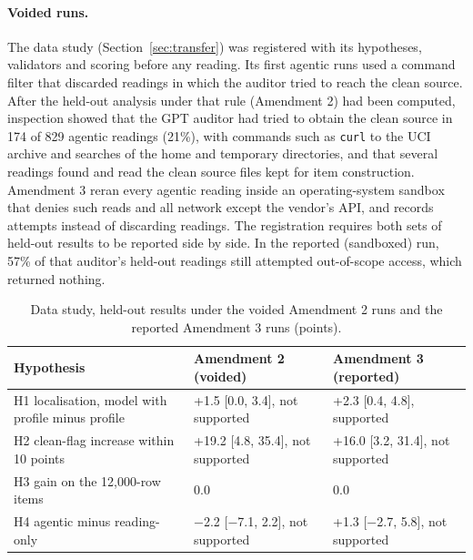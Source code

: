 \paragraph{Voided runs.} The data study (Section~\ref{sec:transfer}) was registered with its hypotheses, validators
and scoring before any reading. Its first agentic runs used a command filter that discarded readings in which the auditor tried to reach the
clean source. After the held-out analysis under that rule (Amendment 2) had been computed, inspection showed that the
GPT auditor had tried to obtain the clean source in 174 of 829 agentic readings (21\%), with commands such as
\texttt{curl} to the UCI archive and searches of the home and temporary directories, and that several readings found
and read the clean source files kept for item construction. Amendment 3 reran every agentic reading inside an
operating-system sandbox that denies such reads and all network except the vendor's API, and records attempts
instead of discarding readings. The registration requires both sets of held-out results to be reported side by side.
In the reported (sandboxed) run, 57\% of that auditor's held-out readings still attempted out-of-scope access, which
returned nothing.

\begin{table}[h]
\centering
\small
\caption{Data study, held-out results under the voided Amendment 2 runs and the reported Amendment 3 runs (points).}
\label{tab:e3-amendments}
\begin{tabular}{lll}
\toprule
Hypothesis & Amendment 2 (voided) & Amendment 3 (reported) \\
\midrule
H1 localisation, model with profile minus profile & +1.5 [0.0, 3.4], not supported & +2.3 [0.4, 4.8], supported \\
H2 clean-flag increase within 10 points & +19.2 [4.8, 35.4], not supported & +16.0 [3.2, 31.4], not supported \\
H3 gain on the 12{,}000-row items & 0.0 & 0.0 \\
H4 agentic minus reading-only & $-$2.2 [$-$7.1, 2.2], not supported & +1.3 [$-$2.7, 5.8], not supported \\
\bottomrule
\end{tabular}
\end{table}
